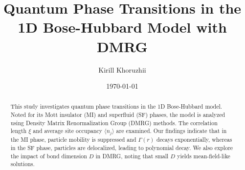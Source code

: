 \documentclass[reprint,amsmath,amssymb,aps,prb]{revtex4-2}
\begin{document}
\title{Quantum Phase Transitions in the 1D Bose-Hubbard Model with DMRG}

\author{Kirill Khoruzhii}

\date{\today}%

\begin{abstract}
This study investigates quantum phase transitions in the 1D Bose-Hubbard model. Noted for its Mott insulator (MI) and superfluid (SF) phases, the model is analyzed using Density Matrix Renormalization Group (DMRG) methods. The correlation length $\xi$ and average site occupancy $\langle n_j \rangle$ are examined. Our findings indicate that in the MI phase, particle mobility is suppressed and $\Gamma(r)$ decays exponentially, whereas in the SF phase, particles are delocalized, leading to polynomial decay. We also explore the impact of bond dimension $D$ in DMRG, noting that small $D$ yields mean-field-like solutions.
\end{abstract}



\maketitle






% 



\newpage


\appendix







% 




% 





% 
% 
% 
% 


% 
\end{document}
